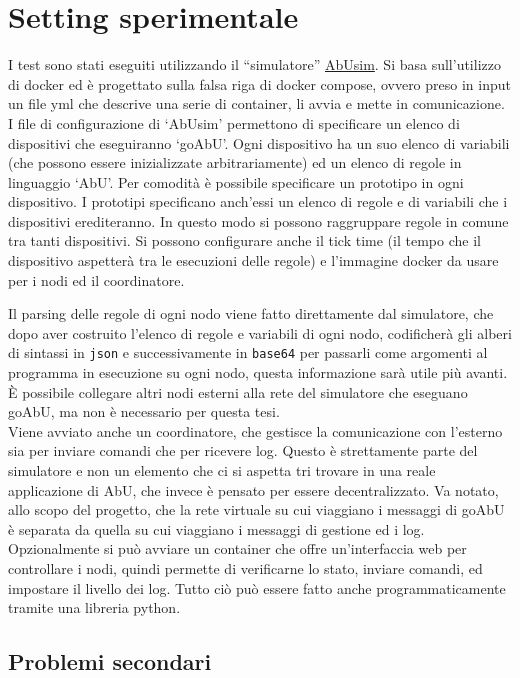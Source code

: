 \documentclass[12pt, a4paper]{article}
\begin{document}
\section{Setting sperimentale}

I test sono stati eseguiti utilizzando il ``simulatore'' \href{https://github.com/abu-lang/abusim}{AbUsim}. Si basa sull'utilizzo di docker ed è progettato sulla falsa riga di docker compose, ovvero preso in input un file yml che descrive una serie di container, li avvia e mette in comunicazione.
I file di configurazione di `AbUsim' permettono di specificare un elenco di dispositivi che eseguiranno `goAbU'. Ogni dispositivo ha un suo elenco di variabili (che possono essere inizializzate arbitrariamente) ed un elenco di regole in linguaggio `AbU'.
Per comodità è possibile specificare un prototipo in ogni dispositivo. I prototipi specificano anch'essi un elenco di regole e di variabili che i dispositivi erediteranno. In questo modo si possono raggruppare regole in comune tra tanti dispositivi.
Si possono configurare anche il tick time (il tempo che il dispositivo aspetterà tra le esecuzioni delle regole) e l'immagine docker da usare per i nodi ed il coordinatore.

Il parsing delle regole di ogni nodo viene fatto direttamente dal simulatore, che dopo aver costruito l'elenco di regole e variabili di ogni nodo, codificherà gli alberi di sintassi in \lstinline{json} e successivamente in \lstinline{base64} per passarli come argomenti al programma in esecuzione su ogni nodo, questa informazione sarà utile più avanti. È possibile collegare altri nodi esterni alla rete del simulatore che eseguano goAbU, ma non è necessario per questa tesi.\\
Viene avviato anche un coordinatore, che gestisce la comunicazione con l'esterno sia per inviare comandi che per ricevere log. Questo è strettamente parte del simulatore e non un elemento che ci si aspetta tri trovare in una reale applicazione di AbU, che invece è pensato per essere decentralizzato. Va notato, allo scopo del progetto, che la rete virtuale su cui viaggiano i messaggi di goAbU è separata da quella su cui viaggiano i messaggi di gestione ed i log.\\
Opzionalmente si può avviare un container che offre un'interfaccia web per controllare i nodi, quindi permette di verificarne lo stato, inviare comandi, ed impostare il livello dei log. Tutto ciò può essere fatto anche programmaticamente tramite una libreria python.

\subsection{Problemi secondari}
\end{document}
